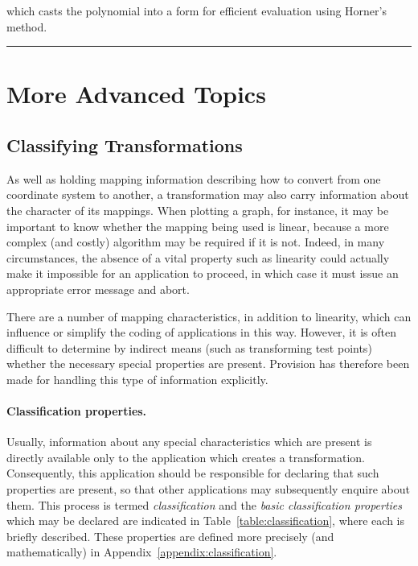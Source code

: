 \documentclass[twoside,nolof,11pt]{starlink}
\providecommand{\exampledone}[0]{\begin{center} \rule{6em}{0.2mm} \end{center}}
\begin{document}
which casts the polynomial into a form for efficient evaluation using
Horner's method.
\exampledone


\section{More Advanced Topics}


\subsection{Classifying Transformations}

\label{section:advanced:classification}

As well as holding mapping information describing how to convert from one
coordinate system to another, a transformation may also carry information
about the character of its mappings.
When plotting a graph, for instance, it may be important to know whether the
mapping being used is linear, because a more complex (and costly) algorithm
may be required if it is not.
Indeed, in many circumstances, the absence of a vital property such as
linearity could actually make it impossible for an application to proceed,
in which case it must issue an appropriate error message and abort.

There are a number of mapping characteristics, in addition to linearity,
which can influence or simplify the coding of applications in this way.
However, it is often difficult to determine by indirect means (such as
transforming test points) whether the necessary special properties are
present.
Provision has therefore been made for handling this type of information
explicitly.

\paragraph{Classification properties.}
Usually, information about any special characteristics which are present is
directly available only to the application which creates a transformation.
Consequently, this application should be responsible for declaring that such
properties are present, so that other applications may subsequently enquire
about them.
This process is termed \emph{classification} and the \emph{basic classification
properties} which may be declared are indicated in
Table~\ref{table:classification}, where each is briefly described.
These properties are defined more precisely (and mathematically) in
Appendix~\ref{appendix:classification}.
\end{document}
